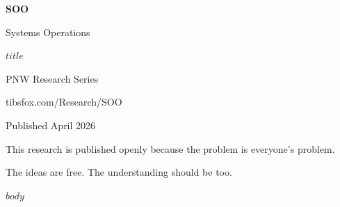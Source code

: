 \documentclass[11pt,a4paper]{article}
\begin{document}
\begin{titlepage}
\centering
\vspace*{3cm}
{\Huge\bfseries\sffamily\color{sooaccent} SOO\par}
\vspace{0.5cm}
{\LARGE\sffamily Systems Operations\par}
\vspace{1cm}
{\Large\sffamily\color{sooops} $title$\par}
\vspace{2cm}
{\large\sffamily PNW Research Series\par}
{\normalsize\sffamily tibsfox.com/Research/SOO\par}
\vspace{1cm}
{\normalsize\sffamily\color{soomuted} Published April 2026\par}
\vfill
{\small\sffamily\color{soomuted} This research is published openly because the problem is everyone's problem.\par
The ideas are free. The understanding should be too.\par}
\end{titlepage}

$body$
\end{document}

